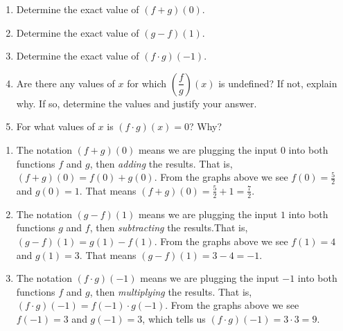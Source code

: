 \documentclass{ximera}
\begin{document}
\begin{example}
\begin{minipage}{.5\textwidth}
\begin{center}
			\end{center}
		\end{minipage}
		\begin{enumerate}
			\item Determine the exact value of $(f+g)(0)$.\\
			\item Determine the exact value of $(g-f)(1)$.\\
			\item Determine the exact value of $(f \cdot g)(-1)$.\\
			\item Are there any values of $x$ for which $\left( \dfrac{f}{g} \right)(x)$ is undefined?  
				If not, explain why.  If so, determine the values and justify your answer.\\
			\item For what values of $x$ is $(f \cdot g)(x) = 0$?  Why?\\
		\end{enumerate}
		\begin{explanation}
			\begin{enumerate}
				\item The notation $(f+g)(0)$ means we are plugging the input $0$ into both functions $f$ and $g$, then \emph{adding} the results.
					That is, $(f+g)(0) = f(0) + g(0)$. From the graphs above we see $f(0) = \frac{5}{2}$ and $g(0) = 1$. That means
					$(f+g)(0) = \frac{5}{2} + 1 = \frac{7}{2}$.

				\item The notation $(g-f)(1)$ means we are plugging the input $1$ into both functions $g$ and $f$, then \emph{subtracting} the
					 results.That is, $(g-f)(1) = g(1) - f(1)$. From the graphs above we see $f(1) = 4$ and $g(1) = 3$. That means
					$(g-f)(1) = 3 - 4 = -1$.					

				\item The notation $(f\cdot g)(-1)$ means we are plugging the input $-1$ into both functions $f$ and $g$, then \emph{multiplying}
					 the results. That is, $(f\cdot g)(-1) = f(-1) \cdot g(-1)$. 
					 From the graphs above we see $f(-1) = 3$ and $g(-1) = 3$, which tells us 
					$(f\cdot g)(-1) = 3 \cdot 3 = 9$.


\end{enumerate}
\end{explanation}
\end{example}
\end{document}
